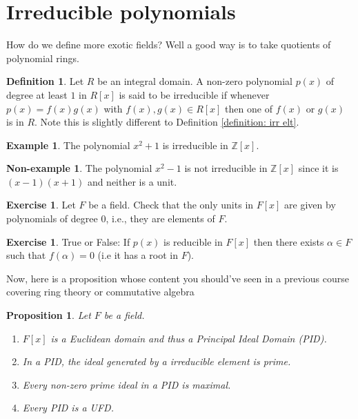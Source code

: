\documentclass[11pt,a4paper]{report}
\theoremstyle{plain}
\newtheorem{prop}[subsection]{Proposition}
\theoremstyle{definition}
\newtheorem{definition}[subsection]{Definition}
\newtheorem{exmp}[subsection]{Example}
\newtheorem{nexmp}[subsection]{Non-example}
\theoremstyle{definition}
\newtheorem{question}[subsection]{Exercise}
\newcommand{\ZZ}{\mathbb{Z}}
\def\QQ{\mathbb{Q}}
\def \a{\alpha}
\begin{document}
	
	\section{Irreducible polynomials}
	How do we define more exotic fields? Well a good way is to take quotients of polynomial rings.
	
	
	\begin{definition}
		Let $R$ be an integral domain.	A non-zero polynomial $p(x)$ of degree at least $1$ in $R[x]$ is said to be irreducible if whenever $p(x)=f(x)g(x)$ with $f(x),g(x) \in R[x]$ then one of $f(x)$ or $g(x)$ is in $R$. Note this is slightly different to Definition \ref{definition: irr elt}.  
	\end{definition}
	
	\begin{exmp}
		The polynomial $x^2+1$ is irreducible  in $\ZZ[x]$.
		
	\end{exmp}
	
	\begin{nexmp}
		The polynomial $x^2-1$ is not irreducible in $\ZZ[x]$ since it is $(x-1)(x+1)$ and neither is a unit.
	\end{nexmp}
	
	\begin{question}\label{Q1}
		Let $F$ be a field.	Check that the only units in $F[x]$ are given by polynomials of degree $0$, i.e., they are elements of $F$.
	\end{question}
	
	\begin{question}
		True or False:	If $p(x)$ is reducible in $F[x]$ then there exists $\a \in F$ such that $f(\a)=0$ (i.e it has a root in $F$). %
	\end{question}
	Now, here is a proposition whose content you should've seen in a previous course covering ring theory or commutative algebra
	
	\begin{prop} \label{prop: background ring theory} Let $F$ be a field.
		\begin{enumerate}
			\item $F[x]$ is a Euclidean domain and thus a Principal Ideal Domain (PID).
			\item In a PID, the ideal generated by a irreducible element is prime.
			\item Every non-zero prime ideal in a PID is maximal.
			\item Every PID is a UFD.	
		\end{enumerate}
		
	\end{prop}
	
\end{document}
